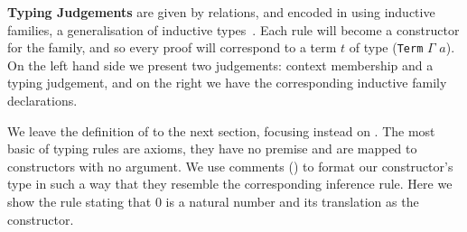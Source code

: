 \begin{center}
\begin{minipage}{0.35\textwidth}
\syntaxcontexts
\end{minipage}\hfill
\begin{minipage}{0.55\textwidth}
\end{minipage}
\end{center}


\textbf{Typing Judgements} are given by relations, and encoded in
\Idris{} using inductive families, a generalisation of inductive
types~\cite{DBLP:journals/fac/Dybjer94}.
%
Each rule will become a constructor for the family, and so every
proof \inferenceRule{} will correspond to a term $t$ of type
(\texttt{Term} $\Gamma$ $a$).
%
On the left hand side we present two judgements: context membership
and a typing judgement, and on the right we have the corresponding
inductive family declarations.

\begin{center}
\begin{minipage}{0.10\textwidth}
\varRule
\inferenceRule
\end{minipage}\hfill
\begin{minipage}{0.80\textwidth}
\end{minipage}
\end{center}

We leave the definition of  to the next section,
focusing instead on .
%
The most basic of typing rules are axioms, they have no premise
and are mapped to constructors with no argument.
We use \Idris{} comments (\IdrisComment{\KatlaDash{}\KatlaDash})
to format our constructor's type in such
a way that they resemble the corresponding inference rule.
%
Here we show the rule stating that $0$ is a natural number and
its translation as the  constructor.

\begin{center}
\begin{minipage}{0.45\textwidth}
\inferenceZero
\end{minipage}\hfill
\begin{minipage}{0.45\textwidth}
\end{minipage}
\end{center}

